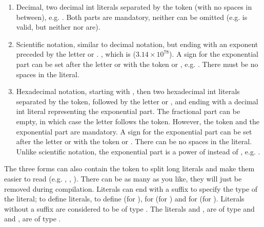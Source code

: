 \begin{enumerate}
  \setlength\itemsep{-4pt}
\item Decimal, two decimal int literals separated by the token  (with
  no spaces in between), e.g. . Both parts are mandatory,
  neither can be omitted (e.g.  is valid, but neither 
  nor  are).

\item Scientific notation, similar to decimal notation, but ending with an
  exponent preceded by the letter  or . , which is ($3.14 \times 10^{78}$). A sign for the
  exponential part can be set after the letter  or  with the
  token \token{-} or \token{+}, e.g. . There must be no spaces in
  the literal.

\item Hexadecimal notation, starting with , then two hexadecimal int
  literals separated by the  token, followed by the letter 
  or , and ending with a decimal int literal representing the
  exponential part. The fractional part can be empty, in which case the letter
   follows the  token. However, the  token and the
   exponential part are mandatory. A sign for the exponential part can
  be set after the letter  or  with the token \token{-} or
  \token{+}. There can be no spaces in the literal. Unlike scientific notation,
  the exponential part is a power of  instead of , e.g.
  .

\end{enumerate}

The three forms can also contain the token \token{\_} to split long literals
and make them easier to read (e.g. ,
, ). There can be as many
\token{\_} as you like, they will just be removed during compilation. Literals
can end with a suffix to specify the type of the literal;  to define
 literals,  to define  (for ),
 for  (for ) and  for
 (for ). Literals without a suffix are considered to
be of type . The literals  and ,
 are of type  and  and
,  are of type .

